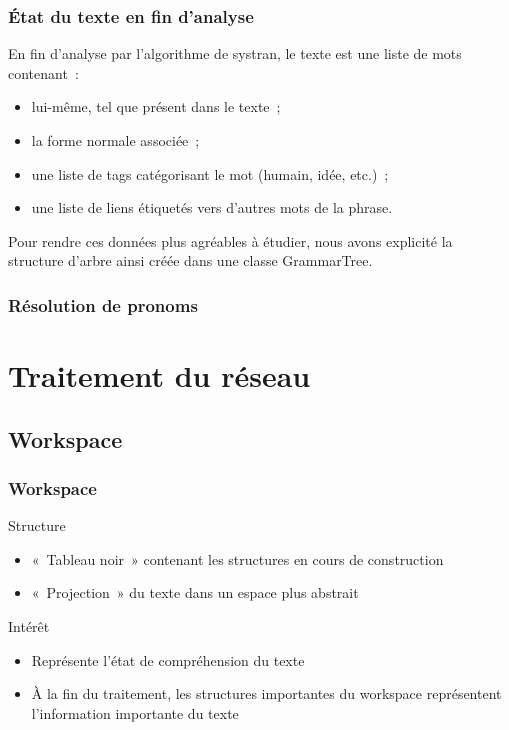 \documentclass[12pt, handout]{beamer}
\begin{document}
\begin{frame}
 \frametitle{État du texte en fin d'analyse}
 En fin d'analyse par l'algorithme de systran, le texte est une liste de mots contenant~:
 \begin{itemize}
  \item lui-même, tel que présent dans le texte~;
  \item la forme normale associée~;
  \item une liste de tags catégorisant le mot (humain, idée, etc.)~;
  \item une liste de liens étiquetés vers d'autres mots de la phrase.
 \end{itemize}
 
 Pour rendre ces données plus agréables à étudier, nous avons explicité la structure d'arbre ainsi créée dans une classe GrammarTree.
 
\end{frame}


\begin{frame}%
 \frametitle{Résolution de pronoms}
 
 
\end{frame}


\section{Traitement du réseau}

\subsection{Workspace}

\begin{frame}
  \frametitle{Workspace}

  \begin{block}{Structure}
    \begin{itemize}
      \item «~Tableau noir~» contenant les structures en cours de construction
      \item «~Projection~» du texte dans un espace plus abstrait
    \end{itemize}
  \end{block}
  \begin{block}{Intérêt}
    \begin{itemize}
      \item Représente l'état de compréhension du texte
      \item À la fin du traitement, les structures importantes du workspace représentent l'information importante du texte
    \end{itemize}
  \end{block}

\end{frame}
\end{document}
